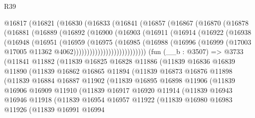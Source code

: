 \begin{lexlean}{R39}
\begin{coremodule}
    @16817
      (@16821
        (@16830
          (@16833
            (@16841
              (@16857
                (@16867
                  (@16870
                    (@16878
                      (@16881
                        (@16889
                          (@16892
                            (@16900
                              (@16903
                                (@16911
                                  (@16914
                                    (@16922
                                      (@16938
                                        (@16948
                                          (@16951
                                            (@16959
                                              (@16975
                                                (@16985
                                                  (@16988
                                                    (@16996
                                                      (@16999
                                                        (@17003
                                                          @17005
                                                          @11362
                                                          @4062)))))))))))))))))))))))))))
    (fun (__b : @3507) =>
    @3733
      (@11841
        @11882
        (@11839
          @16825
          @16828
          @11886
          (@11839
            @16836
            @16839
            @11890
            (@11839
              @16862
              @16865
              @11894
              (@11839
                @16873
                @16876
                @11898
                (@11839
                  @16884
                  @16887
                  @11902
                  (@11839
                    @16895
                    @16898
                    @11906
                    (@11839
                      @16906
                      @16909
                      @11910
                      (@11839
                        @16917
                        @16920
                        @11914
                        (@11839
                          @16943
                          @16946
                          @11918
                          (@11839
                            @16954
                            @16957
                            @11922
                            (@11839
                              @16980
                              @16983
                              @11926
                              (@11839
                                @16991
                                @16994

\end{coremodule}
\end{lexlean}
